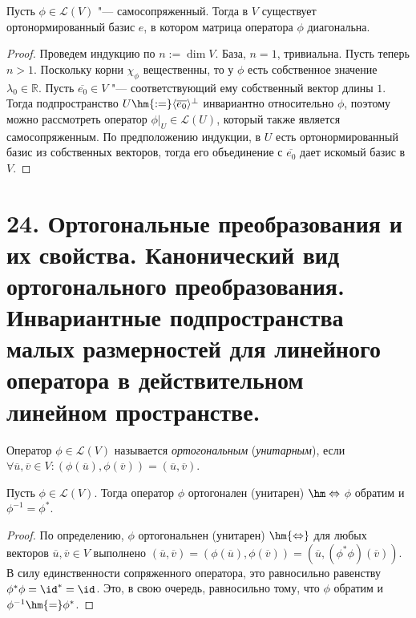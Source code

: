 \begin{theorem}
    Пусть $\phi \in \mathcal{L}(V)$ "--- самосопряженный. Тогда в $V$ существует ортонормированный базис $e$, в котором матрица оператора $\phi$ диагональна.
\end{theorem}

\begin{proof}
    Проведем индукцию по $n := \dim{V}$. База, $n = 1$, тривиальна. Пусть теперь $n > 1$. Поскольку корни $\chi_\phi$ вещественны, то у $\phi$ есть собственное значение $\lambda_0 \in \mathbb{R}$. Пусть $\overline{e_0} \in V$ "--- соответствующий ему собственный вектор длины $1$. Тогда подпространство $U \hm{:=} \langle\overline{e_0}\rangle^\perp$ инвариантно относительно $\phi$, поэтому можно рассмотреть оператор $\phi|_{U} \in \mathcal{L}(U)$, который также является самосопряженным. По предположению индукции, в $U$ есть ортонормированный базис из собственных векторов, тогда его объединение с $\overline{e_0}$ дает искомый базис в $V$.
\end{proof}

\section{24. Ортогональные преобразования и их свойства. Канонический вид ортогонального преобразования. Инвариантные подпространства малых размерностей для линейного оператора в действительном линейном пространстве.}

\begin{definition}
    Оператор $\phi \in \mathcal{L}(V)$ называется \textit{ортогональным} (\textit{унитарным}), если $\forall \overline{u}, \overline{v} \in V: (\phi(\overline{u}), \phi(\overline{v})) = (\overline{u}, \overline{v})$.
\end{definition}

\begin{theorem}
    Пусть $\phi \in \mathcal{L}(V)$. Тогда оператор $\phi$ ортогонален (унитарен) $\hm\Leftrightarrow$ $\phi$ обратим и $\phi^{-1} = \phi^{*}$.
\end{theorem}

\begin{proof}
    По определению, $\phi$ ортогональнен (унитарен) $\hm{\Leftrightarrow}$ для любых векторов $\overline{u}, \overline{v} \in V$ выполнено $(\overline{u}, \overline{v}) = (\phi(\overline{u}), \phi(\overline{v})) = (\overline{u}, (\phi^*\phi)(\overline{v}))$. В силу единственности сопряженного оператора, это равносильно равенству $\phi^*\phi = \id^* = \id$. Это, в свою очередь, равносильно тому, что $\phi$ обратим и $\phi^{-1} \hm{=} \phi^{*}$.
\end{proof}

